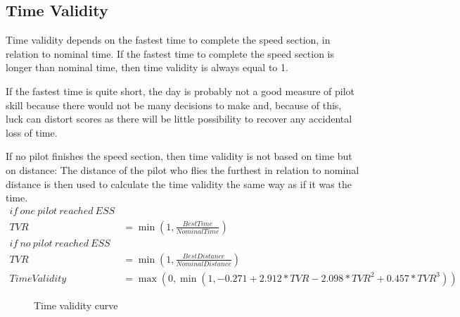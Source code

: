 \documentclass{article}
\begin{document}
\subsection{Time Validity}
Time validity depends on the fastest time to complete the speed section, in
relation to nominal time. If the fastest time to complete the speed section is
longer than nominal time, then time validity is always equal to 1.

If the fastest time is quite short, the day is probably not a good measure of
pilot skill because there would not be many decisions to make and, because of
this, luck can distort scores as there will be little possibility to recover
any accidental loss of time.

If no pilot finishes the speed section, then time validity is not based on time
but on distance: The distance of the pilot who flies the furthest in relation
to nominal distance is then used to calculate the time validity the same way as
if it was the time.
\begin{align*}
    if \ one \ pilot \ reached \ ESS \\
    TVR &= \min(1, \frac{BestTime}{NominalTime}) \\
    if \ no \ pilot \ reached \ ESS \\
    TVR &= \min(1, \frac{BestDistance}{NominalDistance}) \\
    TimeValidity &= \max(0, \min(1, -0.271 + 2.912 * TVR - 2.098 * TVR^2 + 0.457 * TVR^3))
\end{align*}

\begin{figure}[h!]
    
    \caption{Time validity curve}
\end{figure}

\newpage
\end{document}
